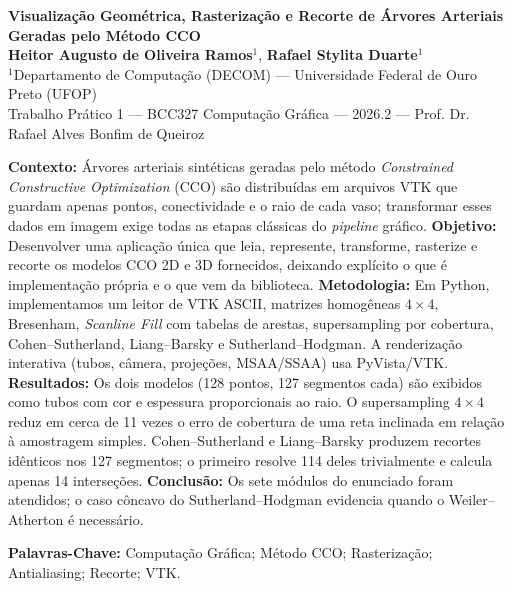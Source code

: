 \documentclass[11pt, a4paper]{article}
\begin{document}
\begin{center}
  {\LARGE \bfseries \textcolor{ufopred}{Visualização Geométrica, Rasterização e Recorte de Árvores Arteriais Geradas pelo Método CCO}}\\[0.4cm]
  {\large \textbf{Heitor Augusto de Oliveira Ramos}$^{1}$, \textbf{Rafael Stylita Duarte}$^{1}$}\\[0.2cm]
  {\small $^{1}$Departamento de Computação (DECOM) --- Universidade Federal de Ouro Preto (UFOP)\\[0.1cm]
  Trabalho Prático 1 --- BCC327 Computação Gráfica --- 2026.2 --- Prof. Dr. Rafael Alves Bonfim de Queiroz}\\[0.4cm]
\end{center}

\begin{tcolorbox}[colback=lightgray, colframe=deepnavy, arc=3pt, title=\textbf{RESUMO}, fonttitle=\bfseries]
\small
\textbf{Contexto:} Árvores arteriais sintéticas geradas pelo método \emph{Constrained Constructive Optimization} (CCO) são distribuídas em arquivos VTK que guardam apenas pontos, conectividade e o raio de cada vaso; transformar esses dados em imagem exige todas as etapas clássicas do \emph{pipeline} gráfico.
\textbf{Objetivo:} Desenvolver uma aplicação única que leia, represente, transforme, rasterize e recorte os modelos CCO 2D e 3D fornecidos, deixando explícito o que é implementação própria e o que vem da biblioteca.
\textbf{Metodologia:} Em Python, implementamos um leitor de VTK ASCII, matrizes homogêneas $4\times4$, Bresenham, \emph{Scanline Fill} com tabelas de arestas, supersampling por cobertura, Cohen--Sutherland, Liang--Barsky e Sutherland--Hodgman. A renderização interativa (tubos, câmera, projeções, MSAA/SSAA) usa PyVista/VTK.
\textbf{Resultados:} Os dois modelos (128 pontos, 127 segmentos cada) são exibidos como tubos com cor e espessura proporcionais ao raio. O supersampling $4\times4$ reduz em cerca de 11 vezes o erro de cobertura de uma reta inclinada em relação à amostragem simples. Cohen--Sutherland e Liang--Barsky produzem recortes idênticos nos 127 segmentos; o primeiro resolve 114 deles trivialmente e calcula apenas 14 interseções.
\textbf{Conclusão:} Os sete módulos do enunciado foram atendidos; o caso côncavo do Sutherland--Hodgman evidencia quando o Weiler--Atherton é necessário.

\vspace{0.2cm}
\textbf{Palavras-Chave:} Computação Gráfica; Método CCO; Rasterização; Antialiasing; Recorte; VTK.
\end{tcolorbox}
\end{document}
